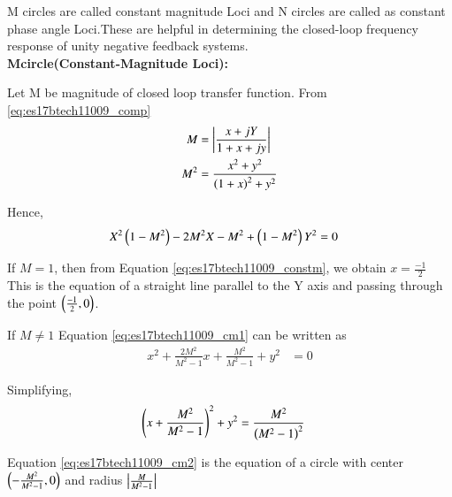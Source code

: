 \begin{enumerate}[label=\thesection.\arabic*.,ref=\thesection.\theenumi]
M circles are called constant magnitude Loci and N circles are called as
constant phase angle Loci.These are helpful in determining the closed-loop frequency response of unity negative feedback systems. \\
\textbf{Mcircle(Constant-Magnitude Loci):} 

Let M be magnitude of closed loop transfer function. From \eqref{eq:es17btech11009_comp}
\begin{align}
M &= \abs{\frac{x+j Y}{1+x+j y}}
\\
M^{2} &= \frac{x^{2}+y^{2}}{\brak{1+x}^{2}+y^{2}}
\label{eq:es17btech11009_constm}
\end{align}

Hence,
\begin{align}
X^{2}\brak{1-M^{2}}-2M^{2}X-M^{2}+\brak{1-M^{2}}Y^{2} &= 0
\label{eq:es17btech11009_cm1}
\end{align}

If $M=1$, then from Equation \eqref{eq:es17btech11009_constm}, we obtain $x =\frac{-1}{2}$ This is the equation of a straight line parallel to the Y axis and passing through the point $\left(\frac{-1}{2},0\right)$.

If $M \neq 1$ Equation \eqref{eq:es17btech11009_cm1} can be written as
\begin{align}
x^{2}+\frac{2M^{2}}{M^{2}-1}x+\frac{M^{2}}{M^{2}-1}+y^{2} &= 0
\end{align}

Simplifying,
\begin{align}
\brak{x+\frac{M^{2}}{M^{2}-1}}^{2}+y^{2} &= \frac{M^{2}}{\brak{M^{2}-1}^{2}}
\label{eq:es17btech11009_cm2}
\end{align}

Equation \eqref{eq:es17btech11009_cm2} is the equation of a circle with center 
$\left(-\frac{M^{2}}{M^{2}-1},0\right)$ and radius $\left\vert\frac{M}{M^{2}-1}\right\vert$


\end{enumerate}
